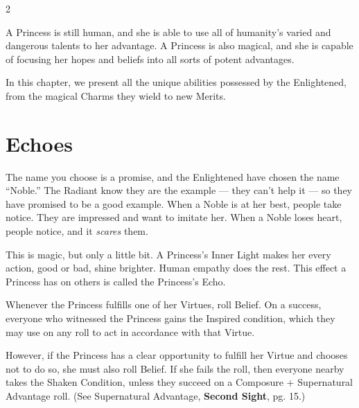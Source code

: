 

\label{cha:PowerOfLove}

\begin{multicols}{2}\raggedcolumns

\noindent A Princess is still human, and she is able to use all of humanity's varied and dangerous talents to her advantage. A Princess is also magical, and she is capable of focusing her hopes and beliefs into all sorts of potent advantages. 

In this chapter, we present all the unique abilities possessed by the Enlightened, from the magical Charms they wield to new Merits.


\section*{Echoes}
\label{sec:Echoes}

The name you choose is a promise, and the Enlightened have chosen the name “Noble.” The Radiant know they are the example — they can't help it — so they have promised to be a good example. When a Noble is at her best, people take notice. They are impressed and want to imitate her. When a Noble loses heart, people notice, and it \textit{scares} them.  

This is magic, but only a little bit. A Princess's Inner Light makes her every action, good or bad, shine brighter. Human empathy does the rest. This effect a Princess has on others is called the Princess's Echo. 

Whenever the Princess fulfills one of her Virtues, roll Belief. On a success, everyone who witnessed the Princess gains the Inspired condition, which they may use on any roll to act in accordance with that Virtue. 

However, if the Princess has a clear opportunity to fulfill her Virtue and chooses not to do so, she must also roll Belief. If she fails the roll, then everyone nearby takes the Shaken Condition, unless they succeed on a Composure + Supernatural Advantage roll. (See Supernatural Advantage, \textbf{Second Sight}, pg. 15.)


\end{multicols}
